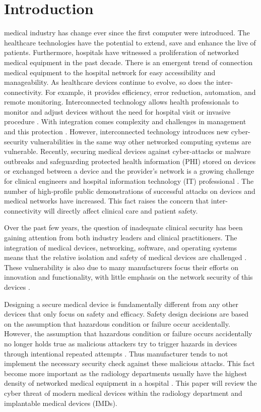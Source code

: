 \documentclass{IEEEtran}
\begin{document}
\section{Introduction}
 medical industry has change ever since the first computer were introduced. The healthcare technologies have the potential to extend, save and enhance the live of patients. Furthermore, hospitals have witnessed a proliferation of networked medical equipment in the past decade. There is an emergent trend of connection medical equipment to the hospital network for easy accessibility and manageability. As healthcare devices continue to evolve, so does the inter-connectivity. For example, it provides efficiency, error reduction, automation, and remote monitoring. Interconnected technology allows health professionals to monitor and adjust devices without the need for hospital visit or invasive procedure \cite{coventry2018cybersecurity}. With integration comes complexity and challenges in management and this protection \cite{williams2015cybersecurity}. However, interconnected technology introduces new cyber-security vulnerabilities in the same way other networked computing systems are vulnerable. Recently, securing medical devices against cyber-attacks or malware outbreaks and safeguarding protected health information (PHI) stored on devices or exchanged between a device and the provider's network is a growing challenge for clinical engineers and hospital information technology (IT) professional \cite{wirth2011cybercrimes}. The number of high-profile public demonstrations of successful attacks on devices and medical networks have increased. This fact raises the concern that inter-connectivity will directly affect clinical care and patient safety. \par
Over the past few years, the question of inadequate clinical security has been gaining attention from both industry leaders and clinical practitioners. The integration of medical devices, networking, software, and operating systems means that the relative isolation and safety of medical devices are challenged \cite{williams2015cybersecurity}. These vulnerability is also due to many manufacturers focus their efforts on innovation and functionality, with little emphasis on the network security of this devices \cite{moses2015lack}. \par
Designing a secure medical device is fundamentally different from  any other devices that only focus on safety and efficacy. Safety design decisions are based on the assumption that hazardous condition or failure occur accidentally. However, the assumption that hazardous condition or failure occurs accidentally no longer holds true as malicious attackers try to trigger hazards in devices through intentional repeated attempts \cite{Ray}. Thus manufacturer tends to not implement the necessary security check against these malicious attacks. This fact become more important as the radiology departments usually have the highest density of networked medical equipment in a hospital \cite{moses2015lack}. This paper will review the cyber threat of modern medical devices within the radiology department and implantable medical devices (IMDs).
\end{document}
